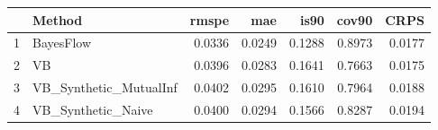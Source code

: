\documentclass[12pt]{article}
\begin{document}
\thispagestyle{empty}
\begin{table}[ht]
\centering
\begin{tabular}{rlrrrrr}
  \hline
 & Method & rmspe & mae & is90 & cov90 & CRPS \\ 
  \hline
1 & BayesFlow & 0.0336 & 0.0249 & 0.1288 & 0.8973 & 0.0177 \\ 
  2 & VB & 0.0396 & 0.0283 & 0.1641 & 0.7663 & 0.0175 \\ 
  3 & VB\_Synthetic\_MutualInf & 0.0402 & 0.0295 & 0.1610 & 0.7964 & 0.0188 \\ 
  4 & VB\_Synthetic\_Naive & 0.0400 & 0.0294 & 0.1566 & 0.8287 & 0.0194 \\ 
   \hline
\end{tabular}
\end{table}
\end{document}
